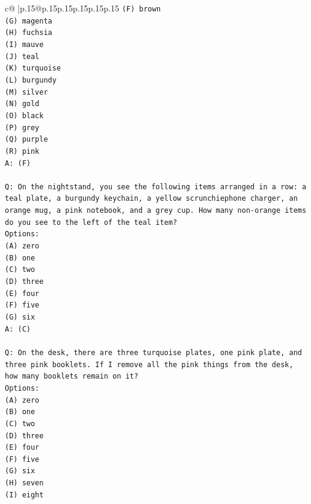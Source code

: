 \documentclass{article}
\begin{document}
{\begin{supertabular}{c@{$\;$}|p{.15\linewidth}@{}p{.15\linewidth}p{.15\linewidth}p{.15\linewidth}p{.15\linewidth}p{.15\linewidth}}
{{{\texttt{(F) brown} \\
\texttt{(G) magenta} \\
\texttt{(H) fuchsia} \\
\texttt{(I) mauve} \\
\texttt{(J) teal} \\
\texttt{(K) turquoise} \\
\texttt{(L) burgundy} \\
\texttt{(M) silver} \\
\texttt{(N) gold} \\
\texttt{(O) black} \\
\texttt{(P) grey} \\
\texttt{(Q) purple} \\
\texttt{(R) pink} \\
\texttt{A: (F)} \\
\\ 
\texttt{Q: On the nightstand, you see the following items arranged in a row: a teal plate, a burgundy keychain, a yellow scrunchiephone charger, an orange mug, a pink notebook, and a grey cup. How many non{-}orange items do you see to the left of the teal item?} \\
\texttt{Options:} \\
\texttt{(A) zero} \\
\texttt{(B) one} \\
\texttt{(C) two} \\
\texttt{(D) three} \\
\texttt{(E) four} \\
\texttt{(F) five} \\
\texttt{(G) six} \\
\texttt{A: (C) } \\
\\ 
\texttt{Q: On the desk, there are three turquoise plates, one pink plate, and three pink booklets. If I remove all the pink things from the desk, how many booklets remain on it?} \\
\texttt{Options:} \\
\texttt{(A) zero} \\
\texttt{(B) one} \\
\texttt{(C) two} \\
\texttt{(D) three} \\
\texttt{(E) four} \\
\texttt{(F) five} \\
\texttt{(G) six} \\
\texttt{(H) seven} \\
\texttt{(I) eight} \\
}}}
\end{supertabular}}
\end{document}
